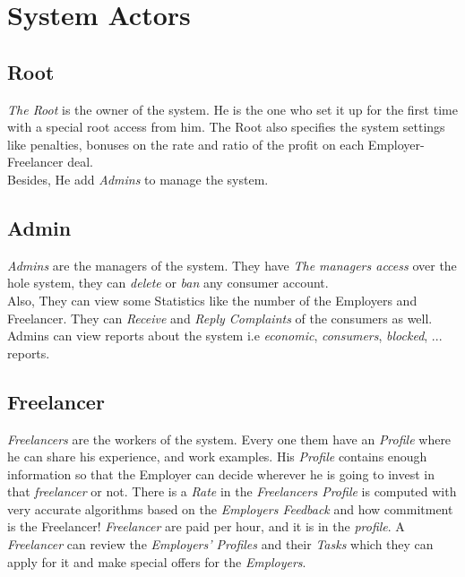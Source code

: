 \documentclass{article}
\begin{document}
\section{System Actors}
\subsection{Root}
\hspace{0.5cm} \textit{The Root} is the owner of the system. He is the one
who set it up for the first time with a special root access from him.
The Root also specifies the system settings like penalties,
bonuses on the rate and ratio of the profit on each Employer-Freelancer deal. \\
Besides, He add \textit{Admins} to manage the system.









\subsection{Admin}
\hspace{0.5cm} \textit{Admins} are the managers of the system. They have
\textit{The managers access} over the hole system, they can \textit{delete}
or \textit{ban} any consumer account. \\
Also, They can view some Statistics like the number of the Employers and
Freelancer. They can \textit{Receive} and \textit{Reply Complaints} of the
consumers as well. \\Admins can view reports about the system
 i.e \textit{economic}, \textit{consumers}, \textit{blocked}, ...   reports.

\subsection{Freelancer}
\hspace{0.5cm} \textit{Freelancers} are the workers of the system.
Every one them have an \textit{Profile} where he can share his experience,
and work examples. His \textit{Profile} contains enough information
so that the Employer can decide wherever he is going to invest in that
\textit{freelancer} or not.
There is a \textit{Rate} in the \textit{Freelancers Profile} is computed
with very accurate algorithms based on the \textit{Employers Feedback}
and how commitment is the Freelancer!
\textit{Freelancer} are paid per hour, and it is in the \textit{profile}.
A \textit{Freelancer} can review the \textit{Employers' Profiles} and
their \textit{Tasks} which they can apply for it and make special offers
for the \textit{Employers}.
\end{document}
